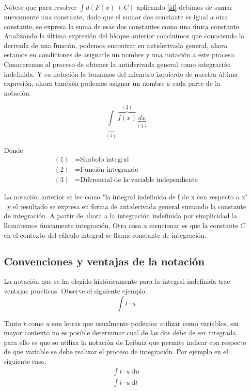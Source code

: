 \documentclass[11pt,letterpaper,oneside]{book}
\numberwithin{equation}{section}
\newcommand{\inti}[2]{\int #1 \text{d}#2}
\begin{document}
	\par %
	Nótese que para resolver $\int{d(F(x)+C)} $ aplicando \eqref{id} debimos de sumar nuevamente una constante, dado que el sumar dos constante es igual a otra constante, se expresa la suma de esas dos constantes como una única constante. Analizando la última expresión del bloque anterior concluimos que conociendo la derivada de una función, podemos encontrar su antiderivada general, ahora estamos en condiciones de asignarle un nombre y una notación a este proceso. Conoceremos al proceso de obtener la antiderivada general como integración indefinida. Y su notación la tomamos del miembro izquierdo de nuestra última expresión, ahora también podemos asignar un nombre a cada parte de la notación.
	
	\[ \underbrace{\int}_{(1)} \overbrace{f(x)}^{(2)} \underbrace{dx}_{(3)}  \]
	\par %
	Donde
	\begin{align*}
	(1) &= \text{Simbolo integral} \\
	(2) &= \text{Función integrando} \\
	(3) &= \text{Diferencial de la variable independiente} 
	\end{align*}
	\par
	La notación anterior se lee como "la integral indefinida de f de x con respecto a x" \ y el resultado se expresa en forma de antiderivada general sumando la constante de integración. A partir de ahora a la integración indefinida por simplicidad la llamaremos únicamente integración. Otra cosa a mencionar es que la constante $C$ en el contexto del cálculo integral se llama constante de integración.
	\subsection{Convenciones y ventajas de la notación}
	\par
	La notación que se ha elegido históricamente para la integral indefinida trae ventajas practicas. Observe el siguiente ejemplo.
	\[ \int t\cdot u \]
	\par
	Tanto $t$ como $u$ son letras que usualmente podemos utilizar como variables, sin mayor contexto no es posible determinar cual de las dos debe de ser integrada, para ello es que se utiliza la notación de Leibniz que permite indicar con respecto de que variable se debe realizar el proceso de integración. Por ejemplo en el siguiente caso.
	\begin{align*}
	\inti{t \cdot u \ }{u} \\
	\inti{t \cdot u \ }{t}
	\end{align*}
	
\end{document}
